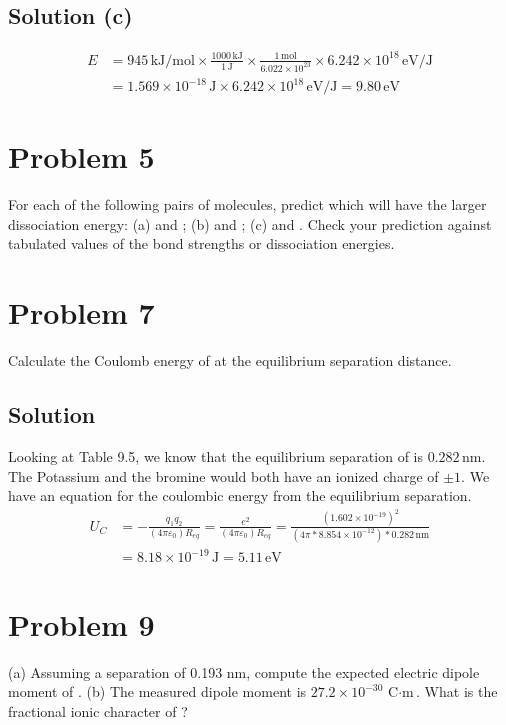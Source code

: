 \documentclass[12pt]{report}
\newcommand{\E}[1]{\times 10^{#1}}
\begin{document}
    \subsection{Solution (c)}
        \begin{align}
            E   &=  945\,\unit{\kilo\joule/\mole} \times \frac{1000\,\unit{\kilo\joule}}{1\,\unit{\joule}} \times \frac{1\,\unit{\mole}}{6.022\E{23}} \times 6.242\E{18}\,\unit{\eV/\joule}\\
                &=  1.569\E{-18}\,\unit{\joule} \times 6.242\E{18}\,\unit{\eV/\joule}
                =   \boxed{9.80\,\unit{\eV}}
        \end{align}
    \pagebreak
 
\section{Problem 5}
    For each of the following pairs of molecules, predict which will have the larger dissociation energy: (a)  and ; (b)  and ; (c)  and . 
    Check your prediction against tabulated values of the bond strengths or dissociation energies.

\section{Problem 7} %
    Calculate the Coulomb energy of  at the equilibrium separation distance.
    
    \subsection{Solution}
        Looking at Table 9.5, we know that the equilibrium separation of  is $0.282\,\unit{\nano\meter}$.
        The Potassium and the bromine would both have an ionized charge of $\pm 1$.
        We have an equation for the coulombic energy from the equilibrium separation. 
        \begin{align}
            U_C &=  -\frac{q_1 q_2}{(4\pi\varepsilon_0)R_{eq}}
                =   \frac{e^2}{(4\pi\varepsilon_0) R_{eq}}
                =   \frac{(1.602\E{-19})^2}{(4\pi * 8.854\E{-12}) * 0.282\,\unit{\nano\meter}}\\
                &=  \boxed{8.18\E{-19}\,\unit{\joule}}
                =   \boxed{5.11\,\unit{\eV}}
        \end{align}

\section{Problem 9}
    (a) Assuming a separation of 0.193 nm, compute the expected electric dipole moment of . 
    (b) The measured dipole moment is $27.2\E{-30}\,\unit{\coulomb\cdot\meter}$. 
    What is the fractional ionic character of ?
\end{document}
